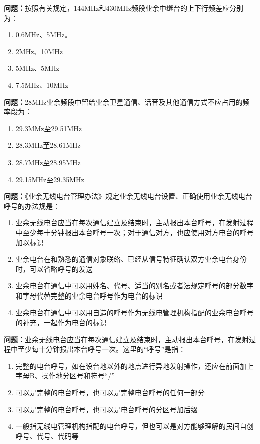 \bigskip


\noindent\textbf{问题：}按照有关规定，144MHz和430MHz频段业余中继台的上下行频差应分别为：
\begin{enumerate}[label=\Alph*), leftmargin=3em]
\item 0.6MHz、5MHz。
\item 2MHz、10MHz
\item 5MHz、5MHz
\item 7.5MHz、10MHz
\end{enumerate}

\bigskip


\noindent\textbf{问题：}28MHz业余频段中留给业余卫星通信、话音及其他通信方式不应占用的频率段为：
\begin{enumerate}[label=\Alph*), leftmargin=3em]
\item 29.3MMz至29.51MHz
\item 28.3MHz至28.61MHz
\item 28.7MHz至28.95MHz
\item 29.15MHz至29.35MHz
\end{enumerate}

\bigskip


\noindent\textbf{问题：}《业余无线电台管理办法》规定业余无线电台设置、正确使用业余无线电台呼号的办法规是：
\begin{enumerate}[label=\Alph*), leftmargin=3em]
\item 业余无线电台应当在每次通信建立及结束时，主动报出本台呼号，在发射过程中至少每十分钟报出本台呼号一次；对于通信对方，也应使用对方电台的呼号加以标识
\item 业余电台在和熟悉的通信对象联络、已经从信号特征确认双方业余电台身份时，可以省略呼号的发送
\item 业余电台在通信中可以用姓名、代号、适当的别名或者法规定呼号的部分数字和字母代替完整的业余电台呼号作为电台的标识
\item 业余电台在通信中可以用自造的呼号作为无线电管理机构指配的业余电台呼号的补充，一起作为电台的标识
\end{enumerate}

\bigskip


\noindent\textbf{问题：}业余无线电台应当在每次通信建立及结束时，主动报出本台呼号，在发射过程中至少每十分钟报出本台呼号一次。这里的“呼号”是指：
\begin{enumerate}[label=\Alph*), leftmargin=3em]
\item 完整的电台呼号，如在设台地以外的地点进行异地发射操作，还应在前面加上字母B、操作地分区号和符号“/”
\item 可以是完整的电台呼号，也可以是完整电台呼号的任何一部分
\item 可以是完整的电台呼号，也可以是电台呼号的分区号加后缀
\item 一般指无线电管理机构指配的电台呼号，但也可以是对方能够理解的民间自创呼号、代号、代码等
\end{enumerate}

